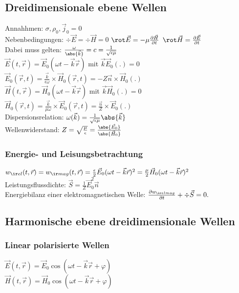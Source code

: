 \documentclass[german, fourcolumn, 6pt]{latex4ei/latex4ei_sheet}
\begin{document}
    \subsection{Dreidimensionale ebene Wellen}
    Annahhmen: $\sigma, \rho_0, \vec j_0 = 0$ \\
    Nebenbedingungen: $\div\vec E =\div \vec H = 0$ \quad $\rot \vec E = -\mu\frac{\partial\vec H}{\partial t}$ \quad $\rot \vec H = \frac{\partial\vec E}{\partial t}$\\
     Dabei muss gelten: $\frac{\omega}{\abs{\vec k}} = c = \frac{1}{\sqrt{\epsilon\mu}}$\\
$\vec E(t,\vec r) = \vec E_0(\omega t-\vec k\vec r)$ mit $\vec k\vec E_0(.) = 0$\\
$\vec E_0(\vec r,t) =\frac{\vec k}{\epsilon \omega} \times \vec H_0(\vec r,t) = -Z\vec n \times \vec H_0(.)$\\
$\vec H(t,\vec r) = \vec H_0(\omega t-\vec k\vec r)$ mit $\vec k\vec H_0(.) = 0$\\
$\vec H_0(\vec r,t) =\frac{\vec k}{\mu \omega} \times \vec E_0(\vec r,t)= \frac{\vec n}{Z}\times \vec E_0(.)$\\
    Dispersionsrelation: $\omega(\vec k) = \frac{1}{\sqrt{\epsilon\mu}}\abs{\vec k}$\\
    Wellenwiderstand: $Z = \sqrt{\frac{\mu}{\epsilon}} = \frac{\abs{\vec E_0}}{\abs{\vec H_0}}$\\
    \subsubsection{Energie- und Leisungsbetrachtung}
$w_{\ir el}(t,\vec r) = w_{\ir mag}(t,\vec r) = \frac{\epsilon}{2}\vec E_0(\omega t-\vec k\vec r)^2 = \frac{\mu}{2}\vec H_0(\omega t-\vec k\vec r)^2$\\
    Leistungsflussdichte: $\vec S = \frac{1}{Z}\vec E_0^2\vec n$\\
    Energiebilanz einer elektromagnetischen Welle: $\frac{\partial w_{\ir elmag}}{\partial t} + \div \vec S = 0.$\\
    \subsection{Harmonische ebene dreidimensionale Wellen}
    \subsubsection{Linear polarisierte Wellen}
$\vec E(t,\vec r) = \vec E_0\cos(\omega t-\vec k\vec r + \varphi)$\\
$\vec H(t,\vec r) = \vec H_0\cos(\omega t-\vec k\vec r + \varphi)$\\
\end{document}
